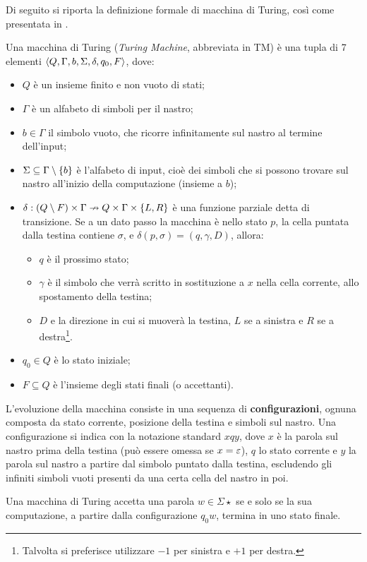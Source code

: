 Di seguito si riporta la definizione formale di macchina di Turing, così come presentata in \cite{Hopcroft:79:introLFA}.
\begin{defin}
	Una macchina di Turing (\emph{Turing Machine}, abbreviata in TM) è una tupla di 7 elementi $\langle Q,\Gamma,b,\Sigma,\delta,q_0,F \rangle$, dove:
	\begin{itemize}
		\item $Q$ è un insieme finito e non vuoto di stati;
		\item $\Gamma$ è un alfabeto di simboli per il nastro;
		\item $b\in\Gamma$ il simbolo vuoto, che ricorre infinitamente sul nastro al termine dell'input;
		\item $\Sigma\subseteq\Gamma\setminus\left\{ b \right\}$ è l'alfabeto di input, cioè dei simboli che si possono trovare sul nastro all'inizio della computazione (insieme a $b$);
		\item $\delta:(Q\setminus F)\times\Gamma\nrightarrow Q\times\Gamma\times\left\{ L,R \right\}$ è una funzione parziale detta di transizione. Se a un dato passo la macchina è nello stato $p$, la cella puntata dalla testina contiene $\sigma$, e $\delta(p,\sigma)=(q,\gamma,D)$, allora:
			\begin{itemize}
				\item $q$ è il prossimo stato;
				\item $\gamma$ è il simbolo che verrà scritto in sostituzione a $x$ nella cella corrente, allo spostamento della testina;
				\item $D$ e la direzione in cui si muoverà la testina, $L$ se a sinistra e $R$ se a destra\footnote{Talvolta si preferisce utilizzare $-1$ per sinistra e $+1$ per destra.}.
			\end{itemize}
		\item $q_0\in Q$ è lo stato iniziale;
		\item $F\subseteq Q$ è l'insieme degli stati finali (o accettanti).
	\end{itemize}
	L'evoluzione della macchina consiste in una sequenza di \textbf{configurazioni}, ognuna composta da stato corrente, posizione della testina e simboli sul nastro. Una configurazione si indica con la notazione standard $xqy$, dove $x$ è la parola sul nastro prima della testina (può essere omessa se $x=\varepsilon$), $q$ lo stato corrente e $y$ la parola sul nastro a partire dal simbolo puntato dalla testina, escludendo gli infiniti simboli vuoti presenti da una certa cella del nastro in poi.

	Una macchina di Turing accetta una parola $w\in\Sigma\star$ se e solo se la sua computazione, a partire dalla configurazione $q_0w$, termina in uno stato finale.
\end{defin}

